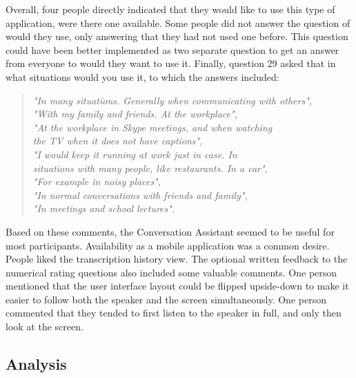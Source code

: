 \documentclass[english, 12pt, a4paper, pdftex, elec, utf8]{aaltothesis}
\renewcommand{\baselinestretch}{1.02}
\begin{document}
Overall, four people directly indicated that they would like to use this type of application, were there one available. Some people did not answer the question of would they use, only answering that they had not used one before. This question could have been better implemented as two separate question to get an answer from everyone to would they want to use it. Finally, question 29 asked that in what situations would you use it, to which the answers included:
\begin{quote}
	\centering
	\renewcommand{\baselinestretch}{1.4}
	\textit{
		"In many situations. Generally when communicating with others", \\
		"With my family and friends. At the workplace", \\
		"At the workplace in Skype meetings, and when watching \\ \vspace{-2.5mm} the TV when it does not have captions", \\
		"I would keep it running at work just in case. In  \\ \vspace{-2.5mm} situations with many people, like restaurants. In a car", \\
		"For example in noisy places", \\
		"In normal conversations with friends and family", \\
		\vspace{2mm}
		"In meetings and school lectures".} \\
\end{quote}
Based on these comments, the Conversation Assistant seemed to be useful for most participants. Availability as a mobile application was a common desire. People liked the transcription history view. The optional written feedback to the numerical rating questions also included some valuable comments. One person mentioned that the user interface layout could be flipped upside-down to make it easier to follow both the speaker and the screen simultaneously. One person commented that they tended to first listen to the speaker in full, and only then look at the screen.

\subsection{Analysis} \label{sec:analysis}
\end{document}
